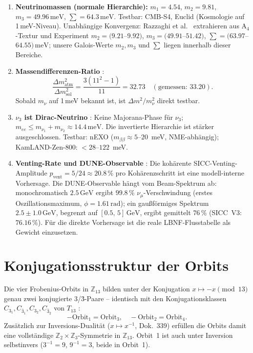 \begin{enumerate}
\item \textbf{Neutrinomassen (normale Hierarchie):}
  $m_1=4.54$, $m_2=9.81$, $m_3=49.96\,\text{meV}$,
  $\sum=64.3\,\text{meV}$.
  Testbar: CMB-S4, Euclid (Kosmologie auf 1\,meV-Niveau).
  Unabhängige Konvergenz: Razzaghi et al.\ \cite{Razzaghi2022}
  extrahieren aus A$_4$-Textur und Experiment
  $m_2=(9.21$--$9.92)$, $m_3=(49.91$--$51.42)$,
  $\sum=(63.97$--$64.55)\,\text{meV}$; unsere Galois-Werte
  $m_2, m_3$ und $\sum$ liegen innerhalb dieser Bereiche.

\item \textbf{Massendifferenzen-Ratio} \KM:
  \[\frac{\Delta m^2_\text{atm}}{\Delta m^2_\text{sol}}
  =\frac{3(11^2-1)}{11}=32.73\quad(\text{gemessen: }33.20).\]
  Sobald $m_\nu$ auf 1\,meV bekannt ist, ist $\Delta m^2/m_\nu^2$
  direkt testbar.

\item \textbf{$\nu_3$ ist Dirac-Neutrino} \BM:
  Keine Majorana-Phase für $\nu_3$; $m_{ee}\leq m_{\nu_1}+m_{\nu_2}\approx14.4\,\text{meV}$.
  Die invertierte Hierarchie ist stärker ausgeschlossen.
  Testbar: nEXO ($m_{\beta\beta}\approx5$--$20$~meV, NME-abhängig); KamLAND-Zen-800: $<28$--$122$~meV.

\item \textbf{Venting-Rate und DUNE-Observable} \KM:
  Die kohärente SICC-Venting-Amplitude
  $p_\text{vent}=5/24\approx20.8\,\%$ pro Kohärenzschritt ist
  eine modell-interne Vorhersage. Die DUNE-Observable hängt vom
  Beam-Spektrum ab: monochromatisch $2.5\,\text{GeV}$ ergibt
  $99.8\,\%$ $\nu_\mu$-Verschwindung (erstes Oszillationsmaximum,
  $\phi=1.61\,\text{rad}$); ein gauß\-förmiges Spektrum
  $2.5\pm1.0\,\text{GeV}$, begrenzt auf $[0.5,\,5]\,\text{GeV}$,
  ergibt gemittelt $76\,\%$ (SICC~V3: $76.16\,\%$). Für die
  direkte Vorhersage ist die reale LBNF-Flusstabelle als
  Gewicht einzusetzen.
\end{enumerate}

\section{Konjugationsstruktur der Orbits \BM}

Die vier Frobenius-Orbits in $\mathbb{Z}_{13}$ bilden unter der
Konjugation $x\mapsto-x\pmod{13}$ genau zwei konjugierte
3/\={3}-Paare -- identisch mit den Konjugationsklassen $C_{3_1},
C_{\bar3_1}, C_{3_2}, C_{\bar3_2}$ von $T_{13}$
\cite{Hartmann2011}:
\[
-\text{Orbit}_1=\text{Orbit}_3,\quad
-\text{Orbit}_2=\text{Orbit}_4.
\]
Zusätzlich zur Inversions-Dualität ($x\mapsto x^{-1}$, Dok.~339)
erfüllen die Orbits damit eine vollständige
$\mathbb{Z}_2\times\mathbb{Z}_3$-Symmetrie in $\mathbb{Z}_{13}$.
Orbit~1 ist auch unter Inversion selbstinvers ($3^{-1}=9$,
$9^{-1}=3$, beide in Orbit~1).


